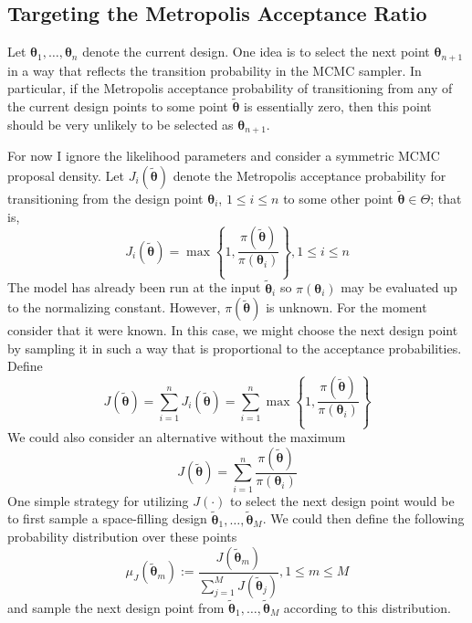 \documentclass[12pt]{article}
\newcommand{\btheta}{\boldsymbol{\theta}}
\begin{document}
\subsection{Targeting the Metropolis Acceptance Ratio}
Let $\btheta_1, \dots, \btheta_n$ denote the current design. One idea is to select the next point $\btheta_{n + 1}$ in a way that reflects the transition probability in the MCMC sampler. 
In particular, if the Metropolis acceptance probability of transitioning from any of the current design points to some point $\tilde{\btheta}$ is essentially zero, then this point should be 
very unlikely to be selected as $\btheta_{n + 1}$. 

For now I ignore the likelihood parameters and consider a symmetric MCMC proposal density. Let $J_i(\tilde{\btheta})$ denote the Metropolis acceptance probability for transitioning 
from the design point $\btheta_i$, $1 \leq i \leq n$ to some other point $\tilde{\btheta} \in \Theta$; that is, 
\[J_i(\tilde{\btheta}) = \max\left\{1, \frac{\pi(\tilde{\btheta})}{\pi(\btheta_i)} \right\}, 1 \leq i \leq n \]
The model has already been run at the input $\tilde{\btheta}_i$ so $\pi(\btheta_i)$ may be evaluated up to the normalizing constant. However, $\pi(\tilde{\btheta})$ is unknown. For the moment 
consider that it were known. In this case, we might choose the next design point by sampling it in such a way that is proportional to the acceptance probabilities. Define 
\[J(\tilde{\btheta}) = \sum_{i = 1}^{n} J_i(\tilde{\btheta}) = \sum_{i = 1}^{n} \max\left\{1, \frac{\pi(\tilde{\btheta})}{\pi(\btheta_i)} \right\} \]
We could also consider an alternative without the maximum
\[J(\tilde{\btheta}) = \sum_{i = 1}^{n} \frac{\pi(\tilde{\btheta})}{\pi(\btheta_i)}\]
One simple strategy for utilizing $J(\cdot)$ to select the next design point would be to first sample a space-filling design $\tilde{\btheta}_1, \dots, \tilde{\btheta}_M$. We could then define the following
probability distribution over these points
\[\mu_J(\tilde{\btheta}_m) := \frac{J(\tilde{\btheta}_m)}{\sum_{j = 1}^{M} J(\tilde{\btheta}_j)}, 1 \leq m \leq M\]
and sample the next design point from $\tilde{\btheta}_1, \dots, \tilde{\btheta}_M$ according to this distribution. 
\end{document}
